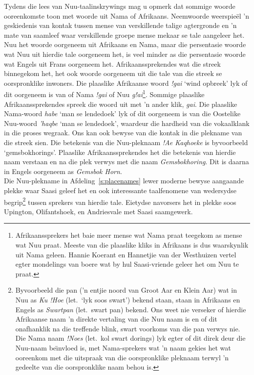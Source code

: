 Tydens die lees van N\textipa{\textvertline}uu-taalinskrywings mag u
opmerk dat sommige woorde ooreenkomste toon met woorde uit Nama of
Afrikaans. Neemwoorde weerspie\"{e}l 'n geskiedenis van kontak tussen
mense van verskillende talige agtergronde en 'n mate van saamleef waar
verskillende groepe mense mekaar se tale aangeleer het.
N\textipa{\textvertline}uu het woorde oorgeneem uit Afrikaans en Nama,
maar die persentasie woorde wat N\textipa{\textvertline}uu uit hierdie
tale oorgeneem het, is veel minder as die persentasie woorde wat
Engels uit Frans oorgeneem het. Afrikaanssprekendes wat die streek
binnegekom het, het ook woorde oorgeneem uit die tale van die streek
se oorspronklike inwoners. Die plaaslike Afrikaanse woord \emph{!gai}
`wind opbreek' lyk of dit oorgeneem is van of Nama \emph{!gai} of
N\textipa{\textvertline}uu \emph{g!ai}\footnote{Afrikaanssprekers het
baie meer mense wat Nama praat teegekom as mense wat
N\textipa{\textvertline}uu praat. Meeste van die plaaslike kliks in
Afrikaans is dus waarskynlik uit Nama geleen.  Hannie Koerant en
Hannetjie van der Westhuizen vertel egter mondelings van boere wat by
hul Saasi-vriende geleer het om N\textipa{\textvertline}uu te praat.}.
Sommige plaaslike Afrikaanssprekendes spreek die woord uit met 'n
ander klik, \emph{\textipa{\textvertline}gai}. Die plaaslike
Nama-woord \emph{\textipa{\textdoublebarpipe}habe} `man se lendedoek'
lyk of dit oorgeneem is van die Oostelike
N\textipa{\textvertline}uu-woord
\emph{\textipa{\textdoublebarpipe}'haqbe} `man se lendedoek', waardeur
die hardheid van die vokaalklank in die proses wegraak. Ons kan ook
bewyse van die kontak in die plekname van die streek sien. Die
betekenis van die N\textipa{\textvertline}uu-pleknaam \emph{!Ae
Ka\textipa{\textdoublevertline}qhoeke} is byvoorbeeld
`gemsbokhorings'.  Plaaslike Afrikaanssprekendes het die betekenis van
hierdie naam verstaan en na die plek verwys met die naam
\emph{Gemsbokhoring}. Dit is daarna in Engels oorgeneem as
\emph{Gemsbok Horn}.\\

Die N\textipa{\textvertline}uu-plekname in Afdeling~\ref{s:placenames}
lewer moderne bewyse aangaande plekke waar Saasi geleef het en ook
interessante taalfenomene van wedersydse begrip\footnote{Byvoorbeeld
die pan ('n entjie noord van Groot Aar en Klein Aar) wat in
N\textipa{\textvertline}uu as \emph{Ku !Hoe} (let.\ `lyk soos swart')
bekend staan, staan in Afrikaans en Engels as \emph{Swartpan} (let.\
swart pan) bekend. Ons weet nie verseker of hierdie Afrikaanse naam 'n
direkte vertaling van die N\textipa{\textvertline}uu naam is en of dit
onafhanklik na die treffende blink, swart voorkoms van die pan verwys
nie. Die Nama naam \emph{!Noes} (let.\ kol swart dorings) lyk egter of
dit direk deur die N\textipa{\textvertline}uu-naam be\"{\i}nvloed is, met Nama-sprekers wat
'n naam gekies het wat ooreenkom met die uitspraak van die
oorspronklike pleknaam terwyl 'n gedeelte van die oorspronklike naam
behou is.} tussen sprekers van hierdie tale. Eietydse navorsers het in
plekke soos Upington, Olifantshoek, en Andriesvale met Saasi
saamgewerk.\\

